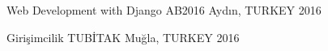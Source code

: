 \begin{cvhonors}
    
\end{cvhonors}

\begin{cvhonors}
  \cvhonor
    {Web Development with Django}
    {AB2016}
    {Aydın, TURKEY}
    {2016}

  \cvhonor
    {Girişimcilik}
    {TUBİTAK}
    {Muğla, TURKEY}
    {2016}
\end{cvhonors}
